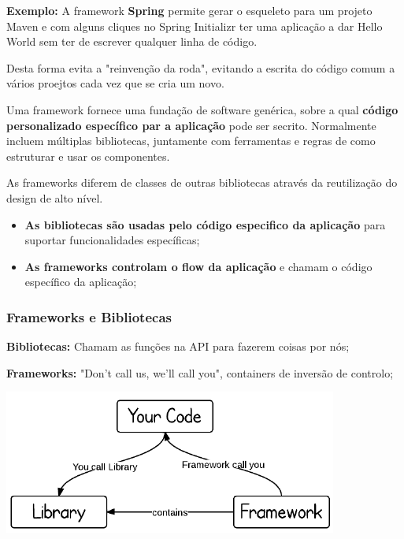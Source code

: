 \documentclass{article}
\begin{document}
\pagebreak

\begin{flushleft}
  \textbf{Exemplo:} A framework \textbf{Spring} permite gerar o esqueleto
  para um projeto Maven e com alguns cliques no Spring Initializr ter
  uma aplicação a dar Hello World sem ter de escrever qualquer linha de código.

  Desta forma evita a "reinvenção da roda", evitando a escrita  do código comum
  a vários proejtos cada vez que se cria um novo.
\end{flushleft}

Uma framework fornece uma fundação de software genérica, sobre a qual
\textbf{código personalizado específico par a aplicação} pode ser secrito.
Normalmente incluem múltiplas bibliotecas, juntamente com ferramentas e
regras de como estruturar e usar os componentes.

\vspace{2mm}

As frameworks diferem de classes de outras bibliotecas através da reutilização
do design de alto nível.
\begin{itemize}
  \item \textbf{As bibliotecas são usadas pelo código especifico
  da aplicação} para suportar funcionalidades específicas;
  \item \textbf{As frameworks controlam o flow da aplicação}
  e chamam o código específico da aplicação;
\end{itemize}

\subsubsection*{Frameworks e Bibliotecas}

\begin{flushleft}
  \textbf{Bibliotecas:} Chamam as funções na API para fazerem coisas por nós;

  \vspace{2mm}

  \textbf{Frameworks:} "Don't call us, we'll call you", containers
  de inversão de controlo;
\end{flushleft}

\begin{center}
  \includegraphics[scale=0.6]{74}
\end{center}
\end{document}
